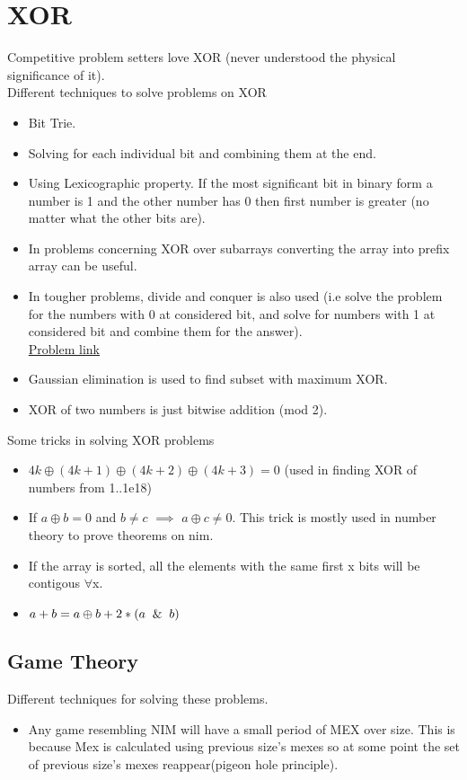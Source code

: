 \documentclass[../Notes.tex]{subfiles}
\begin{document}
\chapter{XOR}
Competitive problem setters love XOR (never understood the physical significance of it).\\

Different techniques to solve problems on XOR
\begin{itemize}
	\item Bit Trie.
	\item Solving for each individual bit and combining them at the end.
	\item Using Lexicographic property. If the most significant bit in binary form a number is 1 and the other number has 0 then first number is greater (no matter what the other bits are).
	\item In problems concerning XOR over subarrays converting the array into prefix array can be useful.
	\item In tougher problems, divide and conquer is also used (i.e solve the problem for the numbers with 0 at considered bit, and solve for numbers with 1 at considered bit and combine them for the answer).\\
	\href{https://www.codechef.com/MARCH12/problems/XOR/}{Problem link}
	\item Gaussian elimination is used to find subset with maximum XOR.
	\item XOR of two numbers is just bitwise addition (mod 2).
\end{itemize}

Some tricks in solving XOR problems
\begin{itemize}
	\item $4k\oplus(4k+1)\oplus(4k+2)\oplus(4k+3)=0$ (used in finding XOR of numbers from 1..1e18)
	\item If $a\oplus b=0$ and $b\neq c$ $\implies$ $a\oplus c\neq0$. This trick is mostly used in number theory to prove theorems on nim.
	\item If the array is sorted, all the elements with the same first x bits will be contigous $\forall$x.
	\item $a+b=a\oplus b + 2*(a\And b)$
\end{itemize}

\section{Game Theory}
Different techniques for solving these problems.
\begin{itemize}
	\item Any game resembling NIM will have a small period of MEX over size. This is because Mex is calculated using previous size's mexes so at some point the set of previous size's mexes reappear(pigeon hole principle).
\end{itemize}
\end{document}
